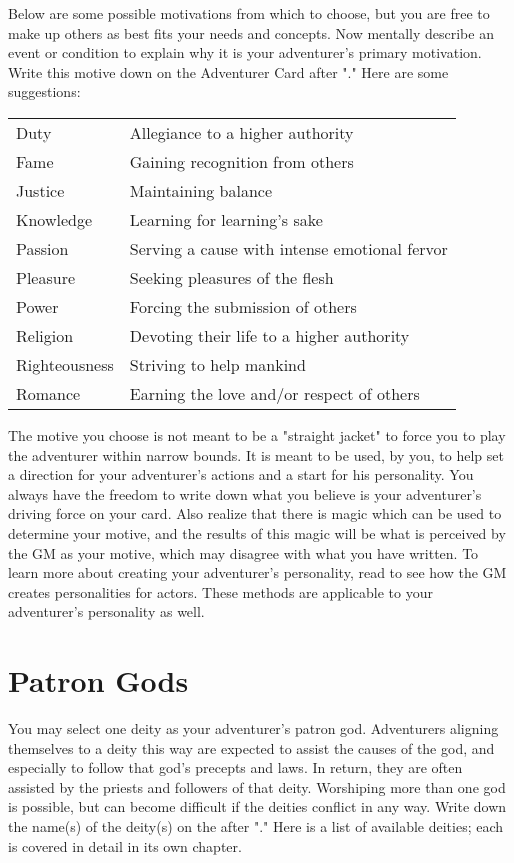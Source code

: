 \begin{multicols*}{2}
Below are some possible motivations from which to choose, but you are free to make up others as best fits your needs and concepts. Now mentally describe an event or condition to explain why it is your adventurer's primary motivation. Write this motive down on the Adventurer Card after "." Here are some suggestions:
\begin{normbox}[Motivation]
\small
\begin{tabularx}{\linewidth}{@{} l L}
Duty & Allegiance to a higher authority\\
Fame & Gaining recognition from others\\
Justice & Maintaining balance\\
Knowledge & Learning for learning's sake\\
Passion & Serving a cause with intense emotional fervor\\
Pleasure & Seeking pleasures of the flesh\\
Power & Forcing the submission of others\\
Religion & Devoting their life to a higher authority\\
Righteousness & Striving to help mankind\\
Romance & Earning the love and/or respect of others
\end{tabularx}
\end{normbox}
\normalsize
The motive you choose is not meant to be a "straight jacket" to force you to play the adventurer within narrow bounds. It is meant to be used, by you, to help set a direction for your adventurer's actions and a start for his personality. You always have the freedom to write down what you believe is your adventurer's driving force on your card. Also realize that there is magic which can be used to determine your motive, and the results of this magic will be what is perceived by the GM as your motive, which may disagree with what you have written.
To learn more about creating your adventurer's personality, read  to see how the GM creates personalities for actors. These methods are applicable to your adventurer's personality as well.
\section{Patron Gods}
You may select one deity as your adventurer's patron god. Adventurers aligning themselves to a deity this way are expected to assist the causes of the god, and especially to follow that god's precepts and laws. In return, they are often assisted by the priests and followers of that deity. Worshiping more than one god is possible, but can become difficult if the deities conflict in any way. Write down the name(s) of the deity(s) on the  after "." Here is a list of available deities; each is covered in detail in its own chapter.


\end{multicols*}
